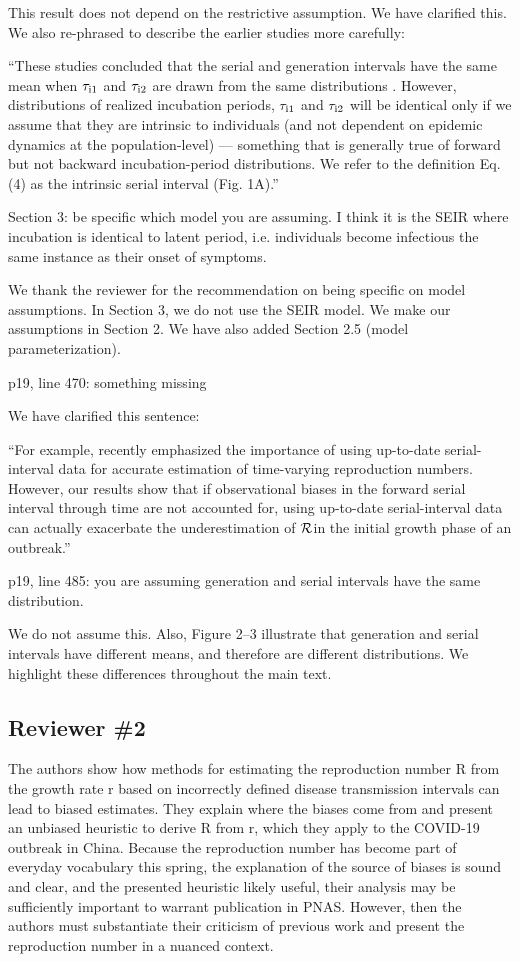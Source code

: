 \documentclass[12pt]{article}
\newcommand{\RR}{\ensuremath{{\cal R}}}
\newcommand{\rev}{\subsection*}
\newcommand{\revtext}{\textsf}
\begin{document}
This result does not depend on the restrictive assumption. We have clarified this. We also re-phrased to describe the earlier studies more carefully:

``These studies concluded that the serial and generation intervals have the same mean when $\tau_{\rm i1}$ and $\tau_{\rm i2}$ are drawn from the same distributions \citep{svensson2007note,klinkenberg2011correlation,champredon2018equivalence, britton2019estimation}.
However, distributions of realized incubation periods, $\tau_{\rm i1}$ and $\tau_{\rm i2}$ will be identical only if we assume that they are intrinsic to individuals (and not dependent on epidemic dynamics at the population-level) ---
something that is generally true of forward but not backward incubation-period distributions.
We refer to the definition Eq. (4) as the intrinsic serial interval (Fig. 1A).''

\revtext{Section 3: be specific which model you are assuming. I think it is the SEIR where incubation is identical to latent period, i.e. individuals become infectious the same instance as their onset of symptoms.}

We thank the reviewer for the recommendation on being specific on model assumptions. In Section 3, we do not use the SEIR model. We make our assumptions in Section 2. We have also added Section 2.5 (model parameterization).

\revtext{p19, line 470: something missing}

We have clarified this sentence:

``For example, \cite{thompson2019improved} recently emphasized the importance of using up-to-date serial-interval data for accurate estimation of time-varying reproduction numbers.
However, our results show that if observational biases in the forward serial interval through time are not accounted for, using up-to-date serial-interval data can actually exacerbate the underestimation of \RR in the initial growth phase of an outbreak.''

\revtext{p19, line 485: you are assuming generation and serial intervals have the same distribution.}

We do not assume this. Also, Figure 2--3 illustrate that generation and serial intervals have different means, and therefore are different distributions. We highlight these differences throughout the main text.

\rev{Reviewer \#2}

\revtext{The authors show how methods for estimating the reproduction number R from the growth rate r based on incorrectly defined disease transmission intervals can lead to biased estimates. They explain where the biases come from and present an unbiased heuristic to derive R from r, which they apply to the COVID-19 outbreak in China. Because the reproduction number has become part of everyday vocabulary this spring, the explanation of the source of biases is sound and clear, and the presented heuristic likely useful, their analysis may be sufficiently important to warrant publication in PNAS. However, then the authors must substantiate their criticism of previous work and present the reproduction number in a nuanced context.}
\end{document}
